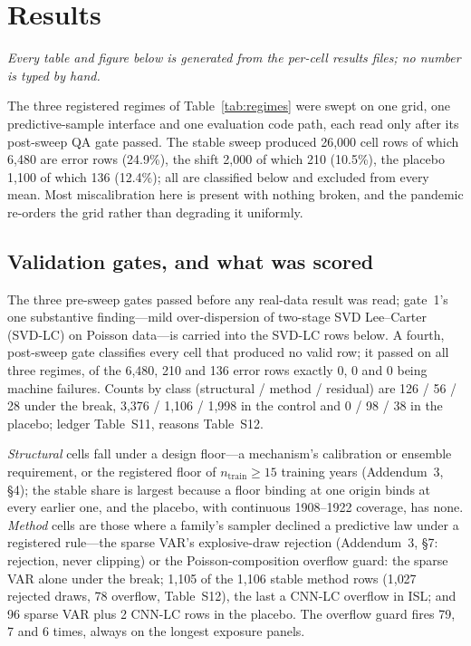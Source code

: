 \section{Results}
\label{sec:results}

\noindent\textit{Every table and figure below is generated from the per-cell
results files; no number is typed by hand.}

The three registered regimes of Table~\ref{tab:regimes} were swept on one grid,
one predictive-sample interface and one evaluation code path, each read only
after its post-sweep QA gate passed. The stable sweep produced 26{,}000 cell
rows of which 6{,}480 are error rows (24.9\%), the shift 2{,}000 of which 210
(10.5\%), the placebo 1{,}100 of which 136 (12.4\%); all are classified below and
excluded from every mean. Most miscalibration here is present with nothing
broken, and the pandemic re-orders the grid rather than degrading it uniformly.

\subsection{Validation gates, and what was scored}
\label{sec:results-infeasible}

The three pre-sweep gates passed before any real-data result was read; gate~1's
one substantive finding---mild over-dispersion of two-stage SVD Lee--Carter
(SVD-LC) on Poisson data---is carried into the SVD-LC rows below. A fourth,
post-sweep gate classifies every cell that produced no valid row; it passed on
all three regimes, of the 6{,}480, 210 and 136 error rows exactly 0, 0 and 0
being machine failures. Counts by class (structural / method / residual) are
126 / 56 / 28 under the break, 3{,}376 / 1{,}106 / 1{,}998 in the control and
0 / 98 / 38 in the placebo; ledger Table~S11, reasons Table~S12.

\emph{Structural} cells fall under a design floor---a mechanism's calibration or
ensemble requirement, or the registered floor of $n_{\text{train}}\ge 15$
training years (Addendum~3, \S4); the stable share is largest because a floor
binding at one origin binds at every earlier one, and the placebo, with
continuous 1908--1922 coverage, has none. \emph{Method} cells are those where a
family's sampler declined a predictive law under a registered rule---the sparse
VAR's explosive-draw rejection (Addendum~3, \S7: rejection, never clipping) or
the Poisson-composition overflow guard: the sparse VAR alone under the break;
1{,}105 of the 1{,}106 stable method rows (1{,}027 rejected draws, 78 overflow,
Table~S12), the last a CNN-LC overflow in ISL; and 96 sparse VAR plus 2 CNN-LC
rows in the placebo. The overflow guard fires 79, 7 and 6 times, always on the
longest exposure panels.

